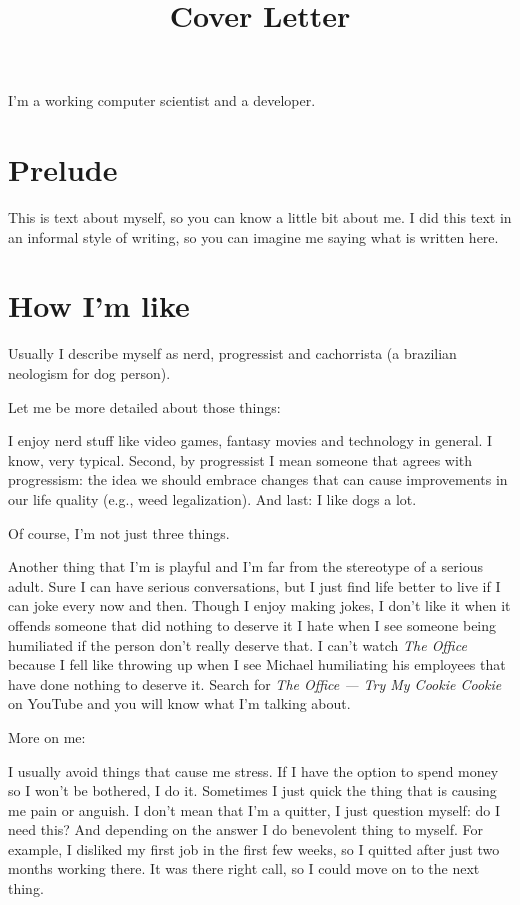 \documentclass[11pt,a4paper,sans]{moderncv}
\title{Cover Letter}
\begin{document}
\makecvtitle %
I'm a working computer scientist and a developer.

\section{Prelude}
This is text about myself, so you can know a little bit about me.
I did this text in an informal style of writing, so you can imagine me saying what is written here.

\section{How I'm like}
Usually I describe myself as nerd, progressist and cachorrista (a brazilian neologism for dog person).

Let me be more detailed about those things:

I enjoy nerd stuff like video games, fantasy movies and technology in general.
I know, very typical.
Second, by progressist I mean someone that agrees with progressism: the idea we should embrace changes that can cause improvements in our life quality (e.g., weed legalization).
And last: I like dogs a lot.

\medskip

Of course, I'm not just three things.

\medskip

Another thing that I'm is playful and I'm far from the stereotype of a serious adult.
Sure I can have serious conversations, but I just find life better to live if I can joke every now and then.
Though I enjoy making jokes, I don't like it when it offends someone that did nothing to deserve it
I hate when I see someone being humiliated if the person don't really deserve that.
I can't watch \textit{The Office} because I fell like throwing up when I see Michael humiliating his employees that have done nothing to deserve it.
Search for \textit{The Office — Try My Cookie Cookie} on YouTube and you will know what I'm talking about.

\medskip

More on me:

\medskip

I usually avoid things that cause me stress.
If I have the option to spend money so I won't be bothered, I do it.
Sometimes I just quick the thing that is causing me pain or anguish.
I don't mean that I'm a quitter, I just question myself: do I need this?
And depending on the answer I do benevolent thing to myself.
For example, I disliked my first job in the first few weeks, so I quitted after just two months working there.
It was there right call, so I could move on to the next thing.
\end{document}
